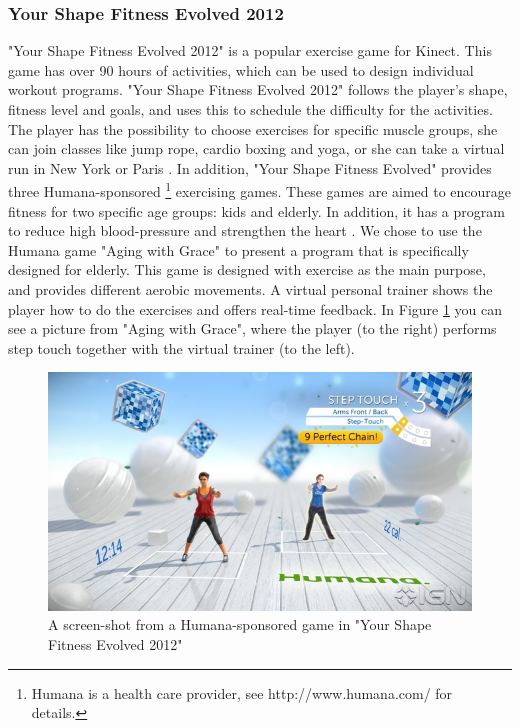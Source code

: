 \subsubsection{Your Shape Fitness Evolved 2012}
"Your Shape Fitness Evolved 2012" is a popular exercise game for Kinect. This game has over 90 hours of activities, which can be used to design individual workout programs. "Your Shape Fitness Evolved 2012" follows the player's shape, fitness level and goals, and uses this to schedule the difficulty for the activities. The player has the possibility to choose exercises for specific muscle groups, she can join classes like jump rope, cardio boxing and yoga, or she can take a virtual run in New York or Paris \cite{yourshape}. In addition, "Your Shape Fitness Evolved" provides three Humana-sponsored \footnote{Humana is a health care provider, see http://www.humana.com/ for details.} exercising games. These games are aimed to encourage fitness for two specific age groups: kids and elderly. In addition, it has a program to reduce high blood-pressure and strengthen the heart \cite{ptspill}. We chose to use the Humana game "Aging with Grace" to present a program that is specifically designed for elderly. This game is designed with exercise as the main purpose, and provides different aerobic movements. A virtual personal trainer shows the player how to do the exercises and offers real-time feedback. In Figure \ref{fig:ptspill} you can see a picture from "Aging with Grace", where the player (to the right) performs step touch together with the virtual trainer (to the left). 

\begin{figure} [H]
\centering
\includegraphics[scale=0.5]{ptspill}
\caption[Your Shape Fitness Evolved 2012]{A screen-shot from a Humana-sponsored game in "Your Shape Fitness Evolved 2012" \cite{ptspill}}
\label{fig:ptspill}
\end{figure}

